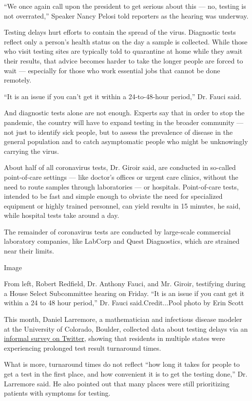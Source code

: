 ``We once again call upon the president to get serious about this ---
no, testing is not overrated,'' Speaker Nancy Pelosi told reporters as
the hearing was underway.

Testing delays hurt efforts to contain the spread of the virus.
Diagnostic tests reflect only a person's health status on the day a
sample is collected. While those who visit testing sites are typically
told to quarantine at home while they await their results, that advice
becomes harder to take the longer people are forced to wait ---
especially for those who work essential jobs that cannot be done
remotely.

``It is an issue if you can't get it within a 24-to-48-hour period,''
Dr. Fauci said.

And diagnostic tests alone are not enough. Experts say that in order to
stop the pandemic, the country will have to expand testing in the
broader community --- not just to identify sick people, but to assess
the prevalence of disease in the general population and to catch
asymptomatic people who might be unknowingly carrying the virus.

About half of all coronavirus tests, Dr. Giroir said, are conducted in
so-called point-of-care settings --- like doctor's offices or urgent
care clinics, without the need to route samples through laboratories ---
or hospitals. Point-of-care tests, intended to be fast and simple enough
to obviate the need for specialized equipment or highly trained
personnel, can yield results in 15 minutes, he said, while hospital
tests take around a day.

The remainder of coronavirus tests are conducted by large-scale
commercial laboratory companies, like LabCorp and Quest Diagnostics,
which are strained near their limits.

Image

From left, Robert Redfield, Dr. Anthony Fauci, and Mr. Giroir,
testifying during a House Select Subcommittee hearing on Friday. ``It is
an issue if you cant get it within a 24 to 48 hour period,'' Dr. Fauci
said.Credit...Pool photo by Erin Scott

This month, Daniel Larremore, a mathematician and infectious disease
modeler at the University of Colorado, Boulder, collected data about
testing delays via an
\href{https://larremorelab.github.io/covid19testgroup}{informal survey
on Twitter}, showing that residents in multiple states were experiencing
prolonged test result turnaround times.

What is more, turnaround times do not reflect ``how long it takes for
people to get a test in the first place, and how convenient it is to get
the testing done,'' Dr. Larremore said. He also pointed out that many
places were still prioritizing patients with symptoms for testing.

